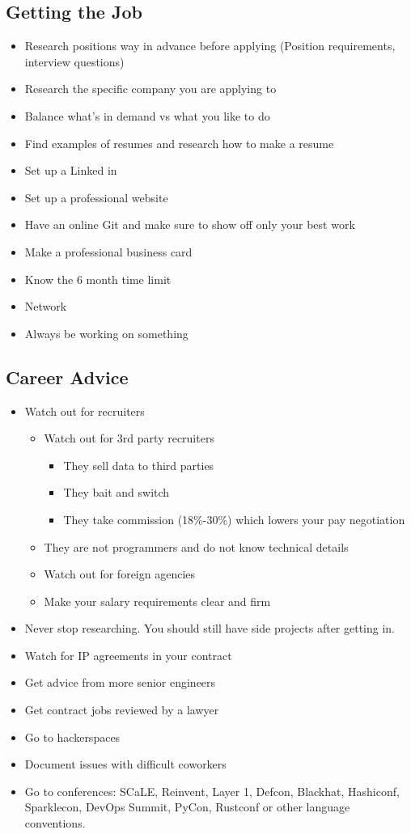 \documentclass[12pt]{article}
\begin{document}
\subsection{Getting the Job}
\begin{itemize}
\item Research positions way in advance before applying (Position
  requirements, interview questions)
\item Research the specific company you are applying to
\item Balance what's in demand vs what you like to do
\item Find examples of resumes and research how to make a resume
\item Set up a Linked in
\item Set up a professional website
\item Have an online Git and make sure to show off only your best work
\item Make a professional business card
\item Know the 6 month time limit
\item Network
\item Always be working on something
\end{itemize}

\subsection{Career Advice}
\begin{itemize}
\item Watch out for recruiters
  \begin{itemize}
  \item Watch out for 3rd party recruiters
    \begin{itemize}
    \item They sell data to third parties
    \item They bait and switch
    \item They take commission (18\%-30\%) which lowers your pay
      negotiation
    \end{itemize}
  \item They are not programmers and do not know technical details
  \item Watch out for foreign agencies
  \item Make your salary requirements clear and firm
  \end{itemize}
\item Never stop researching. You should still have side projects
  after getting in.
\item Watch for IP agreements in your contract
\item Get advice from more senior engineers
\item Get contract jobs reviewed by a lawyer
\item Go to hackerspaces
\item Document issues with difficult coworkers
\item Go to conferences: SCaLE, Reinvent, Layer 1, Defcon, Blackhat,
  Hashiconf, Sparklecon, DevOps Summit, PyCon, Rustconf or other
  language conventions.
\end{itemize}
\end{document}
